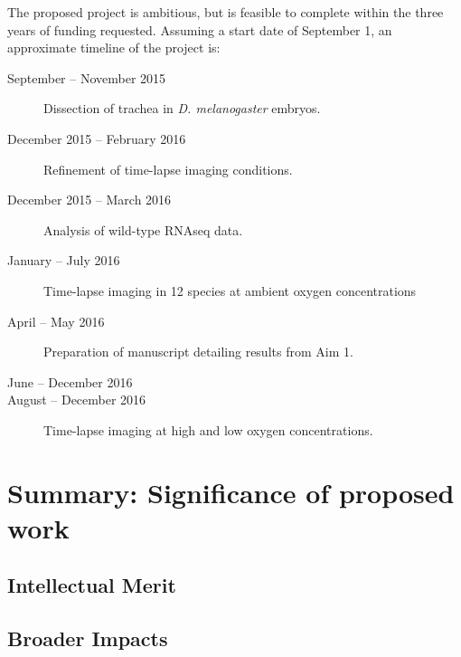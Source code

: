 \documentclass{proposal}
\begin{document}
The proposed project is ambitious, but is feasible to complete within the three years of funding requested.  Assuming a start date of September 1, an approximate timeline of the project is:

\begin{description}
\item[September -- November 2015] Dissection of trachea in {\em D. melanogaster} embryos.

\item[December 2015 -- February 2016] Refinement of time-lapse imaging conditions.

\item[December 2015 -- March 2016] Analysis of wild-type RNAseq data.

\item[January -- July 2016] Time-lapse imaging in 12 species at ambient oxygen concentrations

\item[April -- May 2016] Preparation of manuscript detailing results from Aim 1.

\item[June -- December 2016]

\item[August -- December 2016] Time-lapse imaging at high and low oxygen concentrations.


\item[]

\end{description}



\section{Summary:  Significance of proposed work}

\subsection{Intellectual Merit}

\subsection{Broader Impacts}




\newpage
{}
\renewcommand{\thepage} {E--\arabic{page}}



\end{document}
